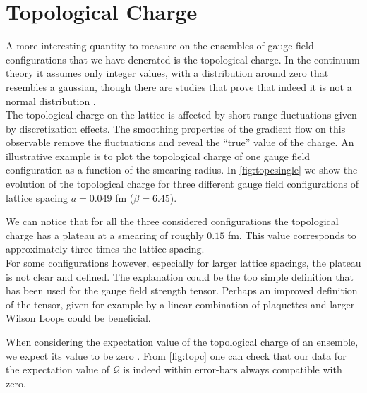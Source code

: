 \section{Topological Charge}
A more interesting quantity to measure on the ensembles of gauge field configurations that we have denerated is the topological charge. In the continuum theory it assumes only integer values, with a distribution around zero that resembles a gaussian, though there are studies that prove that indeed it is not a normal distribution \cite{ce_non-gaussianities_2015}. \\
The topological charge on the lattice is affected by short range fluctuations given by discretization effects. The smoothing properties of the gradient flow on this observable remove the fluctuations and reveal the ``true'' value of the charge. An illustrative example is to plot the topological charge of one gauge field configuration as a function of the smearing radius. In \cref{fig:topcsingle} we show the evolution of the topological charge for three different gauge field configurations of lattice spacing $a=0.049$ fm ($\beta=6.45$). 

We can notice that for all the three considered configurations the topological charge has a plateau at a smearing of roughly $0.15$ fm. This value corresponds to approximately three times the lattice spacing.\\ 
For some configurations however, especially for larger lattice spacings, the plateau is not clear and defined. The explanation could be the too simple definition that has been used for the gauge field strength tensor. Perhaps an improved definition of the tensor, given for example by a linear combination of plaquettes and larger Wilson Loops could be beneficial\cite{alexandrou_comparison_2017}.

When considering the expectation value of the topological charge of an ensemble, we expect its value to be zero \cite{ce_non-gaussianities_2015}. From \cref{fig:topc} one can check that our data for the expectation value of $\mathcal{Q}$ is indeed within error-bars always compatible with zero. 

